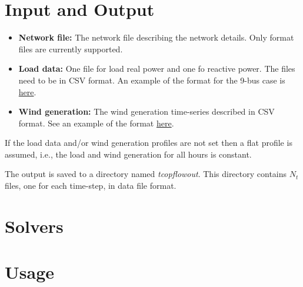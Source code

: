 \section{Input and Output}
\begin{itemize}
    \item \textbf{Network file:} The network file describing the network details. Only \matpower format files are currently supported.
    \item \textbf{Load data:} One file for load real power and one fo reactive power. The files need to be in CSV format. An example of the format for the 9-bus case is \href{https://gitlab.pnnl.gov/exasgd/frameworks/exago/-/tree/master/datafiles/case9}{here}.
    \item \textbf{Wind generation:} The wind generation time-series described in CSV format. See an example of the format \href{https://gitlab.pnnl.gov/exasgd/frameworks/exago/-/tree/master/datafiles/case9}{here}.
\end{itemize}
If the load data and/or wind generation profiles are not set then a flat profile is assumed, i.e., the load and wind generation for all hours is constant.

The \tcopflow output is saved to a directory named \emph{tcopflowout}. This directory contains $N_t$ files, one for each time-step, in \matpower data file format.

\section{Solvers}
\section{Usage}
\todo
